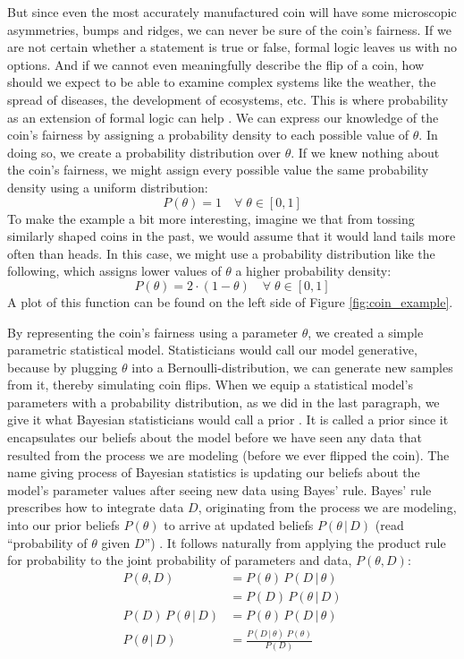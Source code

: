 \documentclass[12pt, a4paper]{report}
\begin{document}
But since even the most accurately manufactured coin will have some microscopic asymmetries, bumps and ridges, we can never be sure of the coin's fairness.
If we are not certain whether a statement is true or false, formal logic leaves us with no options.
And if we cannot even meaningfully describe the flip of a coin, how should we expect to be able to examine complex systems like the weather, the spread of diseases, the development of ecosystems, etc.
This is where probability as an extension of formal logic can help \cite[12]{jaynes}.
We can express our knowledge of the coin's fairness by assigning a probability density to each possible value of $\theta$.
In doing so, we create a probability distribution over $\theta$.
If we knew nothing about the coin's fairness, we might assign every possible value the same probability density using a uniform distribution:
$$
    P(\theta) = 1 \quad \forall \; \theta \in [0,1]
$$
To make the example a bit more interesting, imagine we that from tossing similarly shaped coins in the past, we would assume that it would land tails more often than heads.
In this case, we might use a probability distribution like the following, which assigns lower values of $\theta$ a higher probability density:
$$
    P(\theta) = 2 \cdot (1-\theta) \quad \forall \; \theta \in [0,1]
$$
A plot of this function can be found on the left side of Figure \ref{fig:coin_example}.

By representing the coin's fairness using a parameter $\theta$, we created a simple parametric statistical model.
Statisticians would call our model generative, because by plugging $\theta$ into a Bernoulli-distribution, we can generate new samples from it, thereby simulating coin flips.
When we equip a statistical model's parameters with a probability distribution, as we did in the last paragraph, we give it what Bayesian statisticians would call a prior \cite[34]{mcelreath}.
It is called a prior since it encapsulates our beliefs about the model before we have seen any data that resulted from the process we are modeling (before we ever flipped the coin).
The name giving process of Bayesian statistics is updating our beliefs about the model's parameter values after seeing new data using Bayes' rule.
Bayes' rule prescribes how to integrate data $D$, originating from the process we are modeling, into our prior beliefs $P(\theta)$ to arrive at updated beliefs $P(\theta \, | \, D)$ (read ``probability of $\theta$ given $D$'') \cite[36]{mcelreath}.
It follows naturally from applying the product rule for probability to the joint probability of parameters and data, $P(\theta, D)$: 
\begin{align}
    P(\theta, D) &= P(\theta) \, P(D \,|\, \theta) \nonumber\\
    &= P(D) \, P(\theta \,|\, D) \nonumber\\
    P(D) \, P(\theta \,|\, D) &= P(\theta) \, P(D \,|\, \theta) \nonumber\\
    P(\theta \, | \, D) &= \frac{P(D \,|\, \theta) \; P(\theta)}{P(D)}
    \label{eq:bayes}
\end{align}
\end{document}
